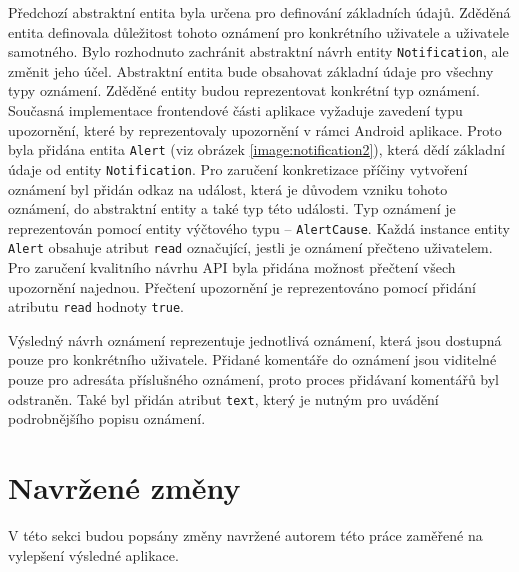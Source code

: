         Předchozí abstraktní entita byla určena pro definování základních údajů. Zděděná entita definovala důležitost tohoto oznámení pro konkrétního uživatele a uživatele samotného. Bylo rozhodnuto zachránit abstraktní návrh entity \verb|Notification|, ale změnit jeho účel. Abstraktní entita bude obsahovat základní údaje pro všechny typy oznámení. Zděděné entity budou reprezentovat konkrétní typ oznámení.
        Současná implementace frontendové části aplikace vyžaduje zavedení typu upozornění, které by reprezentovaly upozornění v rámci Android aplikace. Proto byla přidána entita \verb|Alert| (viz obrázek \ref{image:notification2}), která dědí základní údaje od entity \verb|Notification|. Pro zaručení konkretizace příčiny vytvoření oznámení byl přidán odkaz na událost, která je důvodem vzniku tohoto oznámení, do abstraktní entity a také typ této události. Typ oznámení je reprezentován pomocí entity výčtového typu -- \verb|AlertCause|. 
        Každá instance entity \verb|Alert| obsahuje atribut \verb|read| označující, jestli je oznámení přečteno uživatelem. Pro zaručení kvalitního návrhu API byla přidána možnost přečtení všech upozornění najednou. Přečtení upozornění je reprezentováno pomocí přidání atributu \verb|read| hodnoty \verb|true|.
        
        Výsledný návrh oznámení reprezentuje jednotlivá oznámení, která jsou dostupná pouze pro konkrétního uživatele. Přidané komentáře do oznámení jsou viditelné pouze pro adresáta příslušného oznámení, proto proces přidávaní komentářů byl odstraněn. Také byl přidán atribut \verb|text|, který je nutným pro uvádění podrobnějšího popisu oznámení.
            
\section{Navržené změny}
    V této sekci budou popsány změny navržené autorem této práce zaměřené na vylepšení výsledné aplikace.
    
